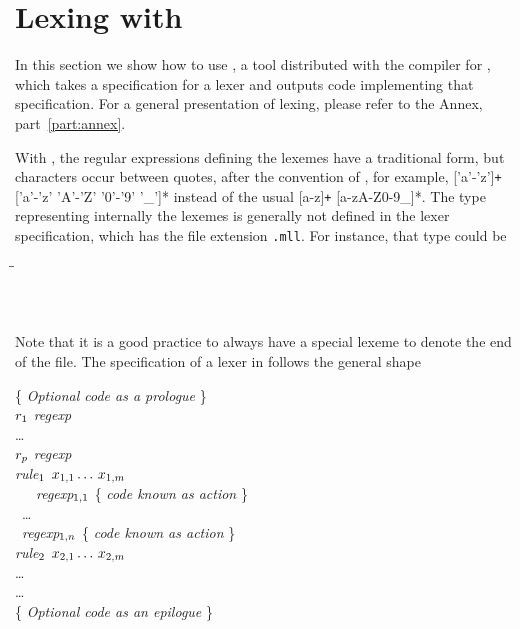\section{Lexing with \ocamllex}

In this section we show how to use \ocamllex, a tool distributed with
the compiler for \OCaml, which takes a specification for a lexer and
outputs \OCaml code implementing that specification. For a general
presentation of lexing, please refer to the Annex,
part~\ref{part:annex}.

With \ocamllex, the regular expressions defining the lexemes have a
traditional form, but characters occur between quotes, after the
convention of \OCaml, for example, \textsf{['a'-'z']\texttt{+}
  ['a'-'z' 'A'-'Z' '0'-'9' '\_']*} instead of the usual
\textsf{[a-z]\texttt{+} [a-zA-Z0-9\_]*}. The \OCaml type representing
internally the lexemes is generally not defined in the lexer
specification, which has the file extension \texttt{.mll}. For
instance, that type could be
\begin{tabbing}
 \Xtype {} \= \equal \= \Tint \Xof {} \vbar{}
 \Tident \Xof {} \vbar{} \Ttrue \vbar{} \Tfalse\\
 \> \vbar \> \Tplus \vbar{} \Tminus \vbar{} \Ttimes \vbar{} \Tslash
 \vbar{} \Tequal \vbar{} \Tarrow\\
 \> \vbar \> \Tlpar \vbar{} \Trpar \vbar{} \Tlet \vbar{} \Tin \vbar{} \Trec\\
 \> \vbar \> \Tfun \vbar{}
 \Tif \vbar{} \Tthen \vbar{} \Telse \vbar{} \Tand \vbar{} \Tor \vbar{}
 \Tnot \vbar{} \Teof
\end{tabbing}
Note that it is a good practice to always have a special lexeme \Teof
to denote the end of the file. The specification of a lexer in
\ocamllex follows the general shape
\begin{tabbing}
\{ \emph{Optional \OCaml code as a prologue} \}\\
\Xlet \(r\sb{1}\) \equal \emph{regexp}\\
\ldots\\
\Xlet \(r\sb{p}\) \equal \emph{regexp}\\
\Xrule \= \emph{rule}\(\sb{1}\) \(x\sb{1,1} \dots\, x\sb{1,m}\) \equal \Xparse\\
\> \ \ \ \emph{regexp}\(\sb{1,1}\) \{ \emph{\OCaml code known as
  \emph{action}} \}\\
\> \vbar{} \ \ldots\\
\> \vbar{} \ \emph{regexp}\(\sb{1,n}\) \{ \emph{\OCaml code known as \emph{action}} \}\\
\Xand \= \emph{rule}\(\sb{2}\) \(x\sb{2,1} \dots\, x\sb{2,m}\) \equal \Xparse\\
\> \ldots\\
\Xand \ldots\\
\{ \emph{Optional \OCaml code as an epilogue} \}
\end{tabbing}
